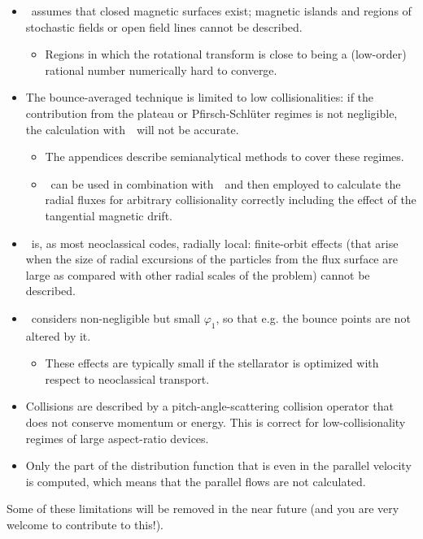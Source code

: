 \begin{itemize}

\item \KNOSOS~assumes that closed magnetic surfaces exist; magnetic islands and regions of stochastic fields or open field lines cannot be described.
\begin{itemize}
\item Regions in which the rotational transform is close to being a (low-order) rational number  numerically hard to converge.
\end{itemize}

\item The bounce-averaged technique is limited to low collisionalities: if the contribution from the plateau or Pfirsch-Schl\"uter regimes is not negligible, the calculation with~\KNOSOS~will not be accurate. 

\begin{itemize}
\item The appendices describe semianalytical methods to cover these regimes. 
\item \KNOSOS~can be used in combination with~\DKES~and then employed to calculate the radial fluxes for arbitrary collisionality correctly including the effect of the tangential magnetic drift.
\end{itemize}

\item \KNOSOS~is, as most neoclassical codes, radially local: finite-orbit effects (that arise when the size of radial excursions of the particles from the flux surface are large as compared with other radial scales of the problem) cannot be described.

\item \KNOSOS~considers non-negligible but small $\varphi_1$, so that e.g. the bounce points are not altered by it.

\begin{itemize}

\item These effects are typically small if the stellarator is optimized with respect to neoclassical transport.

\end{itemize}

\item Collisions are described by a pitch-angle-scattering collision operator that does not conserve momentum or energy. This is correct for low-collisionality regimes of large aspect-ratio devices.

\item Only the part of the distribution function that is even in the parallel velocity is computed, which means that the parallel flows are not calculated.


\end{itemize}

Some of these limitations will be removed in the near future (and you are very welcome to contribute to this!).





